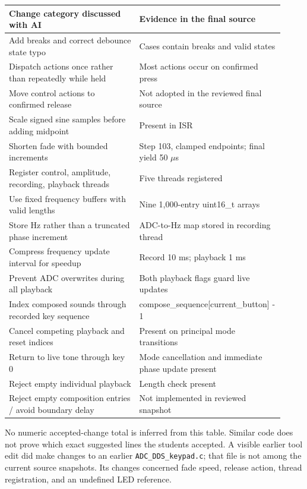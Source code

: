 \documentclass[11pt,letterpaper]{article}
\begin{document}
\begingroup\small
\setlength{\tabcolsep}{5pt}
\begin{longtable}{|>{\raggedright\arraybackslash}p{0.458\linewidth}|>{\raggedright\arraybackslash}p{0.458\linewidth}|}
\hline
\textbf{Change category discussed with AI} & \textbf{Evidence in the final source} \\ \hline
\endhead
Add breaks and correct debounce state typo & Cases contain breaks and valid states \\ \hline
Dispatch actions once rather than repeatedly while held & Most actions occur on confirmed press \\ \hline
Move control actions to confirmed release & Not adopted in the reviewed final source \\ \hline
Scale signed sine samples before adding midpoint & Present in ISR \\ \hline
Shorten fade with bounded increments & Step 103, clamped endpoints; final yield 50 \ensuremath{\mu}s \\ \hline
Register control, amplitude, recording, playback threads & Five threads registered \\ \hline
Use fixed frequency buffers with valid lengths & Nine 1,000-entry uint16\_t arrays \\ \hline
Store Hz rather than a truncated phase increment & ADC-to-Hz map stored in recording thread \\ \hline
Compress frequency update interval for speedup & Record 10 ms; playback 1 ms \\ \hline
Prevent ADC overwrites during all playback & Both playback flags guard live updates \\ \hline
Index composed sounds through recorded key sequence & compose\_sequence[current\_button] - 1 \\ \hline
Cancel competing playback and reset indices & Present on principal mode transitions \\ \hline
Return to live tone through key 0 & Mode cancellation and immediate phase update present \\ \hline
Reject empty individual playback & Length check present \\ \hline
Reject empty composition entries / avoid boundary delay & Not implemented in reviewed snapshot \\ \hline
\end{longtable}
\endgroup

No numeric accepted-change total is inferred from this table. Similar code does not prove which exact suggested lines the students accepted. A visible earlier tool edit did make changes to an earlier \texttt{ADC\_DDS\_keypad.c}; that file is not among the current source snapshots. Its changes concerned fade speed, release action, thread registration, and an undefined LED reference.
\end{document}
